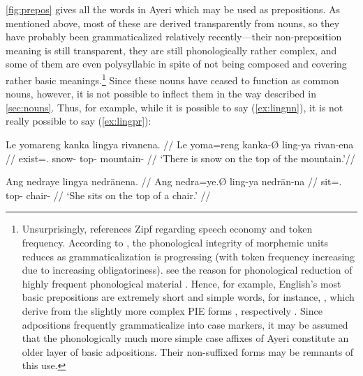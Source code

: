 
\autoref{fig:prepos} gives all the words in Ayeri which may be used as
prepositions. As mentioned above, most of these are derived transparently from
nouns, so they have probably been grammaticalized relatively recently---their
non-preposition meaning is still transparent, they are still phonologically
rather complex, and some of them are even polysyllabic in spite of not being
composed and covering rather basic meanings.\footnote{Unsurprisingly,
\citet[129]{hagege2010} references Zipf regarding speech economy and token
frequency. According to \citet[134--141]{lehmann2015}, the phonological
integrity of morphemic units reduces as grammaticalization is progressing (with
token frequency increasing due to increasing obligatoriness).
\citet{bybeehopper2001b} see the reason for phonological reduction of highly
frequent phonological material . Hence, for example, English's most basic prepositions
are extremely short and simple words, for instance, , which
derive from the slightly more complex PIE forms ,
respectively \citep[1, 39, 269]{kroonen2013}. Since adpositions frequently
grammaticalize into case markers, it may be assumed that the phonologically
much more simple case affixes of Ayeri constitute an older layer of basic
adpositions. Their non-suffixed forms may be remnants of this use.} Since these
nouns have ceased to function as common nouns, however, it is not possible to
inflect them in the way described in \autoref{sec:nouns}. Thus, for example,
while it is possible to say (\ref{ex:lingnn}), it is not really possible to say
(\ref{ex:lingpr}):

\pex
\a\label{ex:lingnn}\begingl
	\gla Le yomareng kanka lingya rivanena. //
	\glb Le yoma=reng kanka-Ø ling-ya rivan-ena //
	\glc \PatTI{} exist=\TsgI{}.\Aarg{} snow-\Top{} top-\Loc{}
		mountain-\Gen{} //
	\glft `There is snow on the top of the mountain.'\footnotemark //
\endgl

\a\label{ex:lingpr}\ljudge* \begingl
	\gla Ang nedraye lingya nedrānena. //
	\glb Ang nedra=ye.Ø ling-ya nedrān-na //
	\glc \AgtT{} sit=\TsgF{}.\Top{} top-\Loc{} chair-\Gen{} //
	\glft `\ques{}She sits on the top of a chair.' //
\endgl

